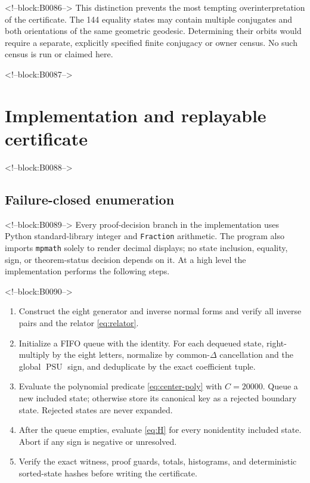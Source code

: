 \documentclass[11pt,a4paper]{article}
\theoremstyle{definition}
\newcommand{\PSU}{\operatorname{PSU}}
\begin{document}
<!--block:B0086-->
This distinction prevents the most tempting overinterpretation of the
certificate.  The 144 equality states may contain multiple conjugates and
both orientations of the same geometric geodesic.  Determining their orbits
would require a separate, explicitly specified finite conjugacy or owner
census.  No such census is run or claimed here.

<!--block:B0087-->
\section{Implementation and replayable certificate}
\label{sec:implementation}

<!--block:B0088-->
\subsection{Failure-closed enumeration}

<!--block:B0089-->
Every proof-decision branch in the implementation uses Python
standard-library integer and \texttt{Fraction} arithmetic.  The program also
imports \texttt{mpmath} solely to render decimal displays; no state inclusion,
equality, sign, or theorem-status decision depends on it.  At a high level the
implementation performs the following steps.

<!--block:B0090-->
\begin{enumerate}[leftmargin=*,label=\arabic*.]
 \item Construct the eight generator and inverse normal forms and verify all
       inverse pairs and the relator \eqref{eq:relator}.
 \item Initialize a FIFO queue with the identity.  For each dequeued state,
       right-multiply by the eight letters, normalize by common-\(\Delta\)
       cancellation and the global \(\PSU\) sign, and deduplicate by the exact
       coefficient tuple.
 \item Evaluate the polynomial predicate \eqref{eq:center-poly} with
       \(C=20000\).  Queue a new included state; otherwise store its canonical
       key as a rejected boundary state.  Rejected states are never expanded.
 \item After the queue empties, evaluate \eqref{eq:H} for every nonidentity
       included state.  Abort if any sign is negative or unresolved.
 \item Verify the exact witness, proof guards, totals, histograms, and
       deterministic sorted-state hashes before writing the certificate.
\end{enumerate}
\end{document}
